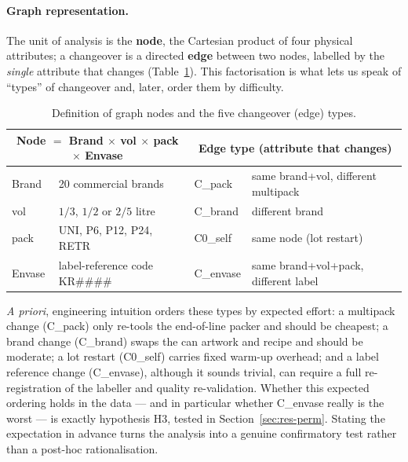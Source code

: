 \documentclass[11pt,a4paper]{article}
\begin{document}
\paragraph{Graph representation.}
The unit of analysis is the \textbf{node}, the Cartesian product of four physical
attributes; a changeover is a directed \textbf{edge} between two nodes, labelled
by the \emph{single} attribute that changes (Table~\ref{tab:nodes}). This
factorisation is what lets us speak of ``types'' of changeover and, later, order
them by difficulty.

\begin{table}[H]\centering\small
\begin{tabular}{@{}llll@{}}
\toprule
\multicolumn{2}{c}{\textbf{Node} $=$ Brand $\times$ vol $\times$ pack $\times$ Envase}
 & \multicolumn{2}{c}{\textbf{Edge type} (attribute that changes)} \\
\midrule
Brand   & 20 commercial brands          & C\_pack   & same brand+vol, different multipack \\
vol     & $1/3$, $1/2$ or $2/5$ litre   & C\_brand  & different brand \\
pack    & UNI, P6, P12, P24, RETR       & C0\_self  & same node (lot restart) \\
Envase  & label-reference code KR\#\#\#\# & C\_envase & same brand+vol+pack, different label \\
\bottomrule
\end{tabular}
\caption{Definition of graph nodes and the five changeover (edge) types.}
\label{tab:nodes}
\end{table}

\emph{A priori}, engineering intuition orders these types by expected effort: a
multipack change (C\_pack) only re-tools the end-of-line packer and should be
cheapest; a brand change (C\_brand) swaps the can artwork and recipe and should be
moderate; a lot restart (C0\_self) carries fixed warm-up overhead; and a label
reference change (C\_envase), although it sounds trivial, can require a full
re-registration of the labeller and quality re-validation. Whether this expected
ordering holds in the data --- and in particular whether C\_envase really is the
worst --- is exactly hypothesis H3, tested in Section~\ref{sec:res-perm}. Stating
the expectation in advance turns the analysis into a genuine confirmatory test
rather than a post-hoc rationalisation.
\end{document}
